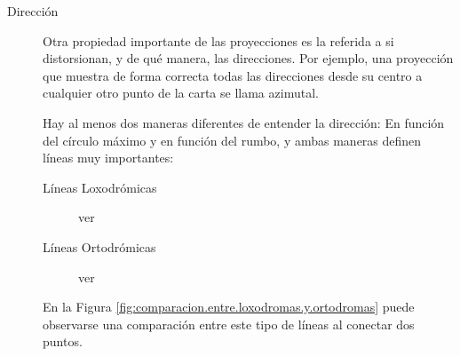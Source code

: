 \begin{description}
\item[Dirección]  Otra propiedad importante de las proyecciones es la referida a si distorsionan, y de qué manera, las direcciones. Por ejemplo, una proyección que muestra de forma correcta todas las direcciones desde su centro a cualquier otro punto de la carta se llama azimutal.

Hay al menos dos maneras diferentes de entender la dirección: En función del círculo máximo y en función del rumbo, y ambas maneras definen líneas muy importantes: 

\begin{description}
	\item[Líneas Loxodrómicas] ver  
	\item[Líneas Ortodrómicas] ver 
\end{description}

En la Figura \ref{fig:comparacion.entre.loxodromas.y.ortodromas} puede observarse una comparaci\'on entre este tipo de l\'ineas al conectar dos puntos.


\end{description}
